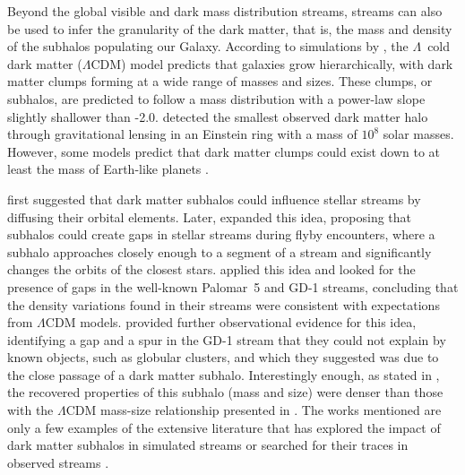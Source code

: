 \documentclass{aa}
\begin{document}
  
  Beyond the global visible and dark mass distribution streams, streams can also be used to infer the granularity of the dark matter, that is, the mass and density of the subhalos populating our Galaxy. According to simulations by \citet{2008MNRAS.391.1685S}, the $\Lambda$~cold dark matter ($\Lambda$CDM) model predicts that galaxies grow hierarchically, with dark matter clumps forming at a wide range of masses and sizes. These clumps, or subhalos, are predicted to follow a mass distribution with a power-law slope slightly shallower than -2.0. \citet{2012Natur.481..341V} detected the smallest observed dark matter halo through gravitational lensing in an Einstein ring with a mass of $10^8$ solar masses. However, some models predict that dark matter clumps could exist down to at least the mass of Earth-like planets \citep[see][and discussion in \citet{2021arXiv211101148A}]{2005JCAP...08..003G}. 

  \citet{2002MNRAS.332..915I} first suggested that dark matter subhalos could influence stellar streams by diffusing their orbital elements. Later, \citet{2012ApJ...748...20C} expanded this idea, proposing that subhalos could create gaps in stellar streams during flyby encounters, where a subhalo approaches closely enough to a segment of a stream and significantly changes the orbits of the closest stars. \citet{2013ApJ...768..171C} applied this idea and looked for the presence of gaps in the well-known Palomar~5 and GD-1 streams, concluding that the density variations found in their streams were consistent with expectations from $\Lambda$CDM models. \citet{2019ApJ...880...38B} provided further observational evidence for this idea, identifying a gap and a spur in the GD-1 stream that they could not explain by known objects, such as globular clusters, and which they suggested was due to the close passage of a dark matter subhalo. Interestingly enough, as stated in \citet{2019ApJ...880...38B}, the recovered properties of this subhalo (mass and size) were denser than those with the $\Lambda$CDM mass-size relationship presented in \cite{2017MNRAS.466.4974M}. The works mentioned are only a few examples of the extensive literature that has explored the impact of dark matter subhalos in simulated streams \citep{2016ApJ...828L..10H, 2021MNRAS.507.1999H, 2021JCAP...10..043B, 2024arXiv240402953H, 2025ApJ...983...68N} or searched for their traces in observed streams \citep{2016MNRAS.460.2711T, 2017MNRAS.470...60E, 2020ApJ...889...70B, 2020ApJ...892L..37B}.
\end{document}
